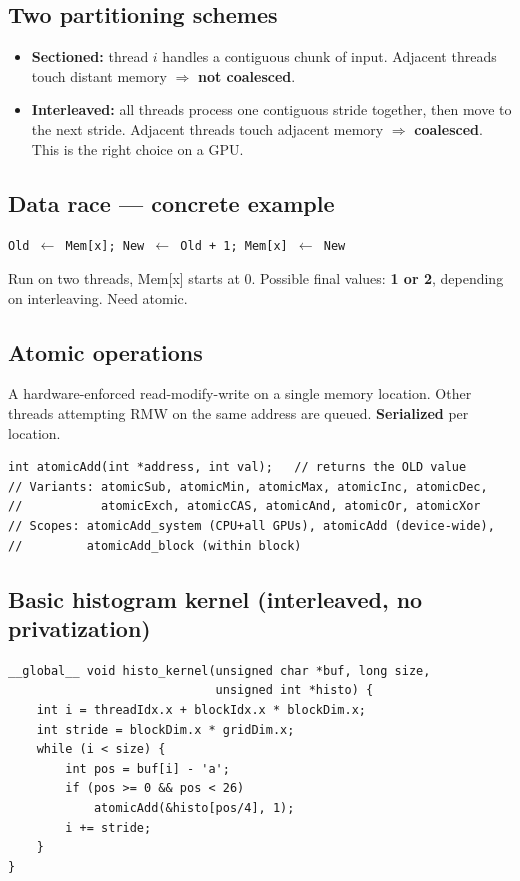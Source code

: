 \documentclass[10pt]{article}
\begin{document}
\subsection*{Two partitioning schemes}
\begin{itemize}
  \item \textbf{Sectioned:} thread $i$ handles a contiguous chunk of input. Adjacent threads touch distant memory $\Rightarrow$ \textbf{not coalesced}.
  \item \textbf{Interleaved:} all threads process one contiguous stride together, then move to the next stride. Adjacent threads touch adjacent memory $\Rightarrow$ \textbf{coalesced}. This is the right choice on a GPU.
\end{itemize}

\subsection*{Data race — concrete example}
\begin{center}
\texttt{Old $\leftarrow$ Mem[x]; New $\leftarrow$ Old + 1; Mem[x] $\leftarrow$ New}
\end{center}
Run on two threads, Mem[x] starts at 0. Possible final values: \textbf{1 or 2}, depending on interleaving. Need atomic.

\subsection*{Atomic operations}
A hardware-enforced read-modify-write on a single memory location. Other threads attempting RMW on the same address are queued. \textbf{Serialized} per location.

\begin{lstlisting}
int atomicAdd(int *address, int val);   // returns the OLD value
// Variants: atomicSub, atomicMin, atomicMax, atomicInc, atomicDec,
//           atomicExch, atomicCAS, atomicAnd, atomicOr, atomicXor
// Scopes: atomicAdd_system (CPU+all GPUs), atomicAdd (device-wide),
//         atomicAdd_block (within block)
\end{lstlisting}

\subsection*{Basic histogram kernel (interleaved, no privatization)}
\begin{lstlisting}
__global__ void histo_kernel(unsigned char *buf, long size,
                             unsigned int *histo) {
    int i = threadIdx.x + blockIdx.x * blockDim.x;
    int stride = blockDim.x * gridDim.x;
    while (i < size) {
        int pos = buf[i] - 'a';
        if (pos >= 0 && pos < 26)
            atomicAdd(&histo[pos/4], 1);
        i += stride;
    }
}
\end{lstlisting}
\end{document}
